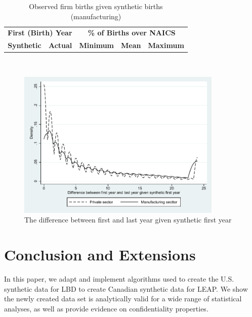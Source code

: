 \documentclass{article}
\begin{document}
\begin{table}[H]
\centering\footnotesize
\caption{Observed firm births given synthetic births (manufacturing)} \label{ProbabilityManufacturing} \medskip
\renewcommand{\arraystretch}{1}
\begin{tabular}{c c| c c c}
\toprule
\multicolumn{2}{c|}{\textbf{First (Birth) Year}} &  \multicolumn{3}{c}{\textbf{\% of Births over NAICS}}\\
\textbf{Synthetic}&\textbf{Actual}&\textbf{Minimum}&\textbf{Mean}&\textbf{Maximum}\\
\midrule

\bottomrule
\end{tabular} 
\\
\justify
\end{table}

\begin{figure} [H]
\centering
\caption{The difference between first and last year given synthetic first year} \label{SyntheticFirstYear}
\includegraphics[height=2.8in, width=.7\linewidth]{graphs/The_difference_between_first_and_last_year_given_synthetic_first_year_bw.pdf} 
\begin{minipage}{0.85\textwidth}
\end{minipage}
\end{figure}

\section{Conclusion and Extensions}

In this paper, we adapt and implement algorithms used to create the U.S. synthetic data for LBD to create Canadian synthetic data for LEAP. We show the newly created data set is analytically valid for a wide range of statistical analyses,  as well as provide evidence on confidentiality properties.
\end{document}
